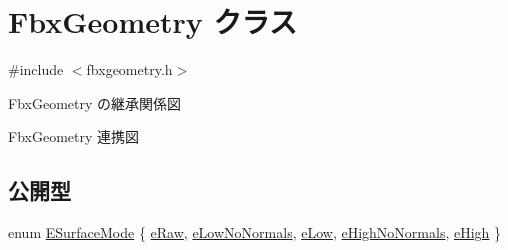 \hypertarget{class_fbx_geometry}{}\section{Fbx\+Geometry クラス}
\label{class_fbx_geometry}


{\ttfamily \#include $<$fbxgeometry.\+h$>$}



Fbx\+Geometry の継承関係図


Fbx\+Geometry 連携図
\subsection*{公開型}
\begin{DoxyCompactItemize}
\item 
enum \hyperlink{class_fbx_geometry_adb9d2e34481a2cb40f1d783c665794db}{E\+Surface\+Mode} \{ \newline
\hyperlink{class_fbx_geometry_adb9d2e34481a2cb40f1d783c665794dbabebe9705fadfcfd4ef100fc493f60412}{e\+Raw}, 
\hyperlink{class_fbx_geometry_adb9d2e34481a2cb40f1d783c665794dba81ece06944d07ab68b5a08a1cb084c55}{e\+Low\+No\+Normals}, 
\hyperlink{class_fbx_geometry_adb9d2e34481a2cb40f1d783c665794dba6da9dccab2d42ec6361050c2deb070a9}{e\+Low}, 
\hyperlink{class_fbx_geometry_adb9d2e34481a2cb40f1d783c665794dbab835bcc45db6e23ee9dc6703614e5300}{e\+High\+No\+Normals}, 
\newline
\hyperlink{class_fbx_geometry_adb9d2e34481a2cb40f1d783c665794dba3f948522e0f01dcacbd6503a3d1e6423}{e\+High}
 \}
\end{DoxyCompactItemize}
